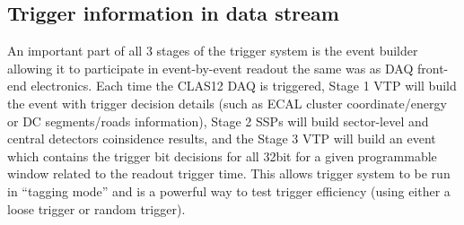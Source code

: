 \subsection{Trigger information in data stream}

An important part of all 3 stages of the trigger system is the event builder allowing it to participate in event-by-event readout the same was as DAQ front-end electronics. Each time the CLAS12 DAQ is triggered, Stage 1 VTP will build the event with trigger decision details (such as ECAL cluster coordinate/energy or DC segments/roads information), Stage 2 SSPs will build sector-level and central detectors coinsidence results, and the Stage 3 VTP will build an event which contains the trigger bit decisions for all 32bit for a given programmable window related to the readout trigger time. This allows trigger system to be run in ``tagging mode'' and is a powerful way to test trigger efficiency (using either a loose trigger or random trigger).

